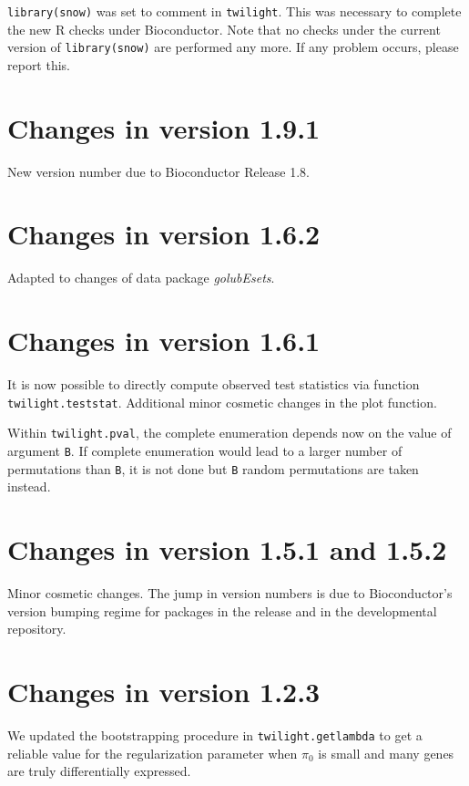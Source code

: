 \documentclass[11pt,a4paper,fleqn]{report}
\newcommand{\Rfunction}[1]{{\texttt{#1}}}
\newcommand{\Rpackage}[1]{{\textit{#1}}}
\newcommand{\Rfunarg}[1]{{\texttt{#1}}}
\begin{document}
\Rfunction{library(snow)} was set to comment in \Rfunction{twilight}. This was necessary to complete the new R checks under Bioconductor. Note that no checks under the current version of \Rfunction{library(snow)} are performed any more. If any problem occurs, please report this.


\section*{Changes in version 1.9.1}

New version number due to Bioconductor Release 1.8.


\section*{Changes in version 1.6.2}

Adapted to changes of data package \Rpackage{golubEsets}.


\section*{Changes in version 1.6.1}

It is now possible to directly compute observed test statistics via function \Rfunction{twilight.teststat}. Additional minor cosmetic changes in the plot function. 

Within \Rfunction{twilight.pval}, the complete enumeration depends now on the value of argument \Rfunarg{B}. If complete enumeration would lead to a larger number of permutations than \Rfunarg{B}, it is not done but \Rfunarg{B} random permutations are taken instead.


\section*{Changes in version 1.5.1 and 1.5.2}

Minor cosmetic changes. The jump in version numbers is due to Bioconductor's version bumping regime for packages in the release and in the developmental repository.


\section*{Changes in version 1.2.3}

We updated the bootstrapping procedure in \Rfunction{twilight.getlambda} to get a reliable value for the regularization parameter when $\pi_0$ is small and many genes are truly differentially expressed.
\end{document}
